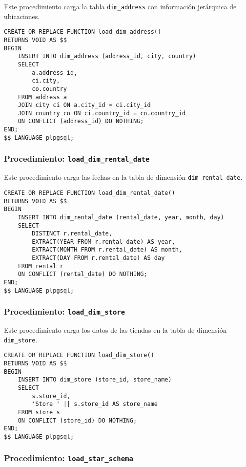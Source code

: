 \documentclass{article}
\begin{document}
Este procedimiento carga la tabla \texttt{dim\_address} con información jerárquica de ubicaciones.

\begin{lstlisting}
CREATE OR REPLACE FUNCTION load_dim_address()
RETURNS VOID AS $$
BEGIN
    INSERT INTO dim_address (address_id, city, country)
    SELECT 
        a.address_id,                
        ci.city,                     
        co.country                   
    FROM address a
    JOIN city ci ON a.city_id = ci.city_id
    JOIN country co ON ci.country_id = co.country_id
    ON CONFLICT (address_id) DO NOTHING;
END;
$$ LANGUAGE plpgsql;
\end{lstlisting}

\subsubsection{Procedimiento: \texttt{load\_dim\_rental\_date}}

Este procedimiento carga las fechas en la tabla de dimensión \texttt{dim\_rental\_date}.

\begin{lstlisting}
CREATE OR REPLACE FUNCTION load_dim_rental_date()
RETURNS VOID AS $$
BEGIN
    INSERT INTO dim_rental_date (rental_date, year, month, day)
    SELECT 
        DISTINCT r.rental_date,            
        EXTRACT(YEAR FROM r.rental_date) AS year,   
        EXTRACT(MONTH FROM r.rental_date) AS month,
        EXTRACT(DAY FROM r.rental_date) AS day
    FROM rental r
    ON CONFLICT (rental_date) DO NOTHING;
END;
$$ LANGUAGE plpgsql;
\end{lstlisting}

\subsubsection{Procedimiento: \texttt{load\_dim\_store}}

Este procedimiento carga los datos de las tiendas en la tabla de dimensión \texttt{dim\_store}.

\begin{lstlisting}
CREATE OR REPLACE FUNCTION load_dim_store()
RETURNS VOID AS $$
BEGIN
    INSERT INTO dim_store (store_id, store_name)
    SELECT 
        s.store_id,                   
        'Store ' || s.store_id AS store_name
    FROM store s
    ON CONFLICT (store_id) DO NOTHING;
END;
$$ LANGUAGE plpgsql;
\end{lstlisting}

\subsubsection{Procedimiento: \texttt{load\_star\_schema}}
\end{document}
